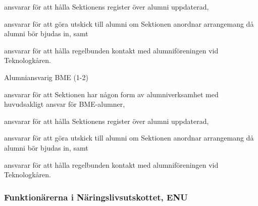 \documentclass[10pt]{article}
\begin{document}
\begin{emptylist}
\begin{dashlist}
            \item ansvarar för att hålla Sektionens register över alumni uppdaterad,
            \item ansvarar för att göra utskick till alumni om Sektionen anordnar arrangemang då alumni
bör bjudas in, samt
            \item  ansvarar för att hålla regelbunden kontakt med alumniföreningen vid Teknologkåren.
        \end{dashlist}
    \item Alumniansvarig BME (1-2)
        \begin{dashlist}
            \item ansvarar för att Sektionen har någon form av alumniverksamhet med huvudsakligt ansvar för BME-alumner,
            \item ansvarar för att hålla Sektionens register över alumni uppdaterad,
            \item ansvarar för att göra utskick till alumni om Sektionen anordnar arrangemang då alumni
bör bjudas in, samt
            \item  ansvarar för att hålla regelbunden kontakt med alumniföreningen vid Teknologkåren.
        \end{dashlist}
\end{emptylist}

\subsubsection{Funktionärerna i Näringslivsutskottet, ENU}
\end{document}

